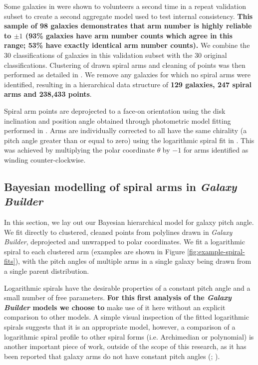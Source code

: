 Some galaxies in \citet{2020arXiv200610450L} were shown to volunteers a second time in a repeat validation subset to create a second aggregate model used to test internal consistency. {\bf This sample of 98  galaxies demonstrates that arm number is highly reliable to $\pm1$ (93\% galaxies have arm number counts which agree in this range; 53\% have exactly identical arm number counts).} We combine the 30 classifications of galaxies in this validation subset with the 30 original classifications. Clustering of drawn spiral arms and cleaning of points was then performed as detailed in \citet{2020arXiv200610450L}. We remove any galaxies for which no spiral arms were identified, resulting in a hierarchical data structure of {\bf 129 galaxies, 247 spiral arms and 238,433 points}.

Spiral arm points are deprojected to a face-on orientation using the disk inclination and position angle obtained through photometric model fitting performed in \citet{2020arXiv200610450L}. Arms are individually corrected to all have the same chirality (a pitch angle greater than or equal to zero) using the logarithmic spiral fit in \citet{2020arXiv200610450L}. This was achieved by multiplying the polar coordinate $\theta$ by $-1$ for arms identified as winding counter-clockwise.

\subsection{Bayesian modelling of spiral arms in \textit{Galaxy Builder}}
\label{section:bhsm-model}
In this section, we lay out our Bayesian hierarchical model for galaxy pitch angle. We fit directly to clustered, cleaned points from polylines drawn in \textit{Galaxy Builder}, deprojected and unwrapped to polar coordinates. We fit a logarithmic spiral to each clustered arm (examples are shown in Figure \ref{fig:example-spiral-fits}), with the pitch angles of multiple arms in a single galaxy being drawn from a single parent distribution.

Logarithmic spirals have the desirable properties of a constant pitch angle and a small number of free parameters. \textbf{For this first analysis of the \textit{Galaxy Builder} models we choose to} make use of it here without an explicit comparison to other models. A simple visual inspection of the fitted logarithmic spirals suggests that it is an appropriate model, however, a comparison of a logarithmic spiral profile to other spiral forms (i.e. Archimedian or polynomial) is another important piece of work, outside of the scope of this research, as it has been reported that galaxy arms do not have constant pitch angles (\citealt{1981AJ.....86.1847K}; \citealt{2009MNRAS.397..164R}).

